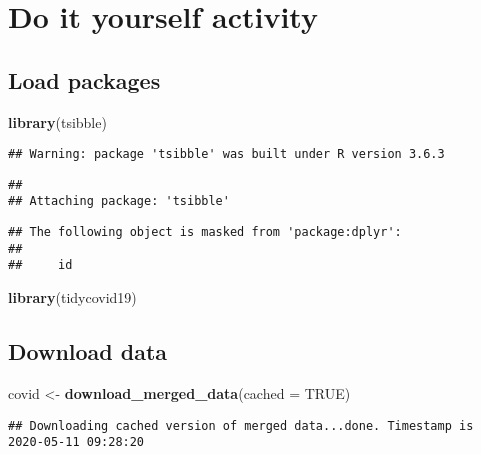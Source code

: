 \documentclass[]{article}
\newenvironment{Shaded}{\begin{snugshade}}{\end{snugshade}}
\newcommand{\KeywordTok}[1]{\textcolor[rgb]{0.13,0.29,0.53}{\textbf{#1}}}
\newcommand{\DataTypeTok}[1]{\textcolor[rgb]{0.13,0.29,0.53}{#1}}
\newcommand{\StringTok}[1]{\textcolor[rgb]{0.31,0.60,0.02}{#1}}
\newcommand{\OtherTok}[1]{\textcolor[rgb]{0.56,0.35,0.01}{#1}}
\newcommand{\NormalTok}[1]{#1}
\begin{document}
\section{Do it yourself activity}\label{do-it-yourself-activity}

\subsection{Load packages}\label{load-packages}

\begin{Shaded}
\begin{Highlighting}[]
\KeywordTok{library}\NormalTok{(tsibble)}
\end{Highlighting}
\end{Shaded}

\begin{verbatim}
## Warning: package 'tsibble' was built under R version 3.6.3
\end{verbatim}

\begin{verbatim}
## 
## Attaching package: 'tsibble'
\end{verbatim}

\begin{verbatim}
## The following object is masked from 'package:dplyr':
## 
##     id
\end{verbatim}

\begin{Shaded}
\begin{Highlighting}[]
\KeywordTok{library}\NormalTok{(tidycovid19)}
\end{Highlighting}
\end{Shaded}

\subsection{Download data}\label{download-data}

\begin{Shaded}
\begin{Highlighting}[]
\NormalTok{covid <-}\StringTok{ }\KeywordTok{download_merged_data}\NormalTok{(}\DataTypeTok{cached =} \OtherTok{TRUE}\NormalTok{)}
\end{Highlighting}
\end{Shaded}

\begin{verbatim}
## Downloading cached version of merged data...done. Timestamp is 2020-05-11 09:28:20
\end{verbatim}
\end{document}
